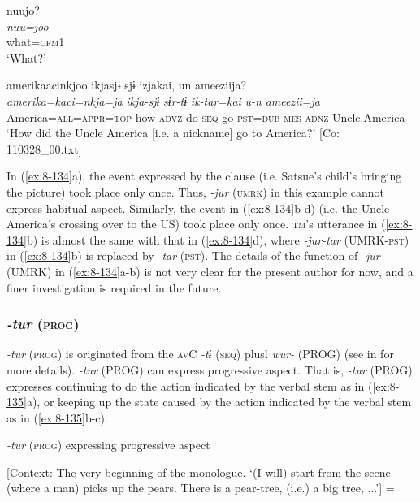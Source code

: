 \ex
{\US}
\glll   nuujo?\\
\textit{nuu=joo}\\
what=\textsc{cfm1}\\
\glt ‘What?’

\ex
{\TM}
\glll  amerikaacinkjoo  ikjasjɨ  sjɨ  izjakai,      un  ameeziija?\\
\textit{amerika=kaci=nkja=ja}  \textit{ikja-sjɨ}  \textit{sɨr-tɨ}  \textit{ik-tar=kai}      \textit{u-n}  \textit{ameezii=ja}\\
America=\textsc{all}=\textsc{appr}=\textsc{top}  how-\textsc{advz}  do-\textsc{seq}  go-\textsc{pst}=\textsc{dub}   \textsc{mes}-\textsc{adnz}  Uncle.America\\
\glt ‘How did the Uncle America [i.e. a nickname] go to America?’ [Co: 110328\_00.txt]
\z
\z

In (\ref{ex:8-134}a), the event expressed by the clause (i.e. Satsue’s child’s bringing the picture) took place only once. Thus, \textit{-jur} (\textsc{umrk}) in this example cannot express habitual aspect. Similarly, the event in (\ref{ex:8-134}b-d) (i.e. the Uncle America’s crossing over to the US) took place only once. \textsc{tm}’s utterance in (\ref{ex:8-134}b) is almost the same with that in (\ref{ex:8-134}d), where \textit{-jur-tar} (UMRK-\textsc{pst}) in (\ref{ex:8-134}b) is replaced by \textit{-tar} (\textsc{pst}). The details of the function of \textit{-jur} (UMRK) in (\ref{ex:8-134}a-b) is not very clear for the present author for now, and a finer investigation is required in the future.

\subsubsection{\textit{-tur} (\textsc{prog})}

\textit{-tur} (\textsc{prog}) is originated from the \textsc{av}C \textit{-tɨ} (\textsc{seq}) plusl \textit{wur-} (PROG) (see  in  for more details). \textit{-tur} (PROG) can express progressive aspect. That is, \textit{-tur} (PROG) expresses continuing to do the action indicated by the verbal stem as in (\ref{ex:8-135}a), or keeping up the state caused by the action indicated by the verbal stem as in (\ref{ex:8-135}b-c).

\ea\label{ex:8-135}
  \textit{-tur} (\textsc{prog}) expressing progressive aspect

  [Context: The very beginning of the monologue. {\TM}
‘(I will) start from the scene (where a man) picks up the pears. There is a pear-tree, (i.e.) a big tree, ...’] = \\

